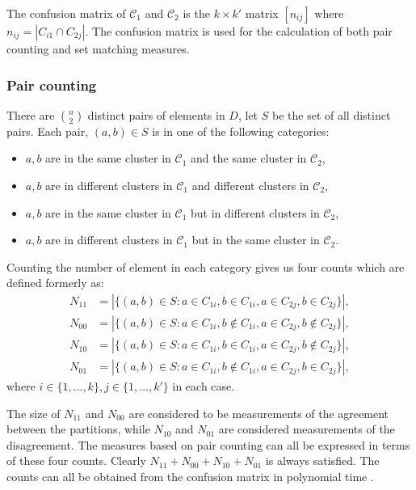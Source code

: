 \documentclass[a4paper]{report}
\newcommand{\dset}{D}
\newcommand{\clus}{\mathcal{C}}
\begin{document}
The confusion matrix of $\clus_1$ and $\clus_2$ is the $k \times k'$ matrix
$[n_{ij}]$ where $n_{ij} = |C_{i1} \cap C_{2j}|$.  The confusion matrix is
used for the calculation of both pair counting and set matching measures.

\subsubsection{Pair counting}
\label{sec:pair-counting}

There are $\binom{n}{2}$ distinct pairs of elements in $\dset$, let $S$ be the
set of all distinct pairs.  Each pair, $(a,b) \in S$ is in one of the
following categories:
\begin{itemize}
\item $a,b$ are in the same cluster in $\clus_1$ and the same cluster in
  $\clus_2$,
\item $a,b$ are in different clusters in $\clus_1$ and different clusters in
  $\clus_2$,
\item $a,b$ are in the same cluster in $\clus_1$ but in different clusters in
  $\clus_2$,
\item $a,b$ are in different clusters in $\clus_1$ but in the same cluster in
  $\clus_2$.
\end{itemize}

Counting the number of element in each category gives us four counts which are
defined formerly as:
\begin{align*}
  N_{11} &= |\{(a,b) \in S \colon
              a \in C_{1i},b \in C_{1i},a \in C_{2j},b \in C_{2j}
            \}|, \\
  N_{00} &= |\{(a,b) \in S \colon
              a \in C_{1i},b \notin C_{1i},a \in C_{2j},b \notin C_{2j}
            \}|, \\
  N_{10} &= |\{(a,b) \in S \colon
              a \in C_{1i},b \in C_{1i},a \in C_{2j},b \notin C_{2j}
            \}|, \\
  N_{01} &= |\{(a,b) \in S \colon
              a \in C_{1i},b \notin C_{1i},a \in C_{2j},b \in C_{2j}
            \}|,
\end{align*}
where $i \in \{1,\dotsc,k\}, j \in \{1,\dotsc,k'\}$ in each case.

The size of $N_{11}$ and $N_{00}$ are considered to be measurements of the
agreement between the partitions, while $N_{10}$ and $N_{01}$ are considered
measurements of the disagreement.  The measures based on pair counting can all
be expressed in terms of these four counts.  Clearly
$N_{11}+N_{00}+N_{10}+N_{01}$ is always satisfied.  The counts can all be
obtained from the confusion matrix in polynomial time
\citep{hubert-arabie-1985}.
\end{document}
